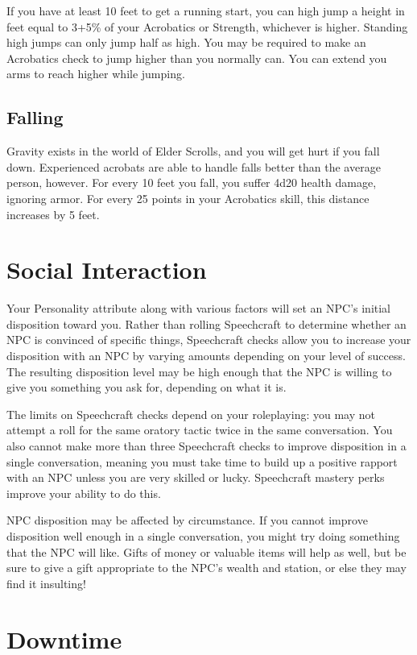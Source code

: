 \documentclass[12pt]{book}
\begin{document}
If you have at least 10 feet to get a running start, you can high jump a height in feet equal to 3+5\% of your Acrobatics or Strength, whichever is higher. Standing high jumps can only jump half as high. You may be required to make an Acrobatics check to jump higher than you normally can. You can extend you arms to reach higher while jumping.

\subsection{Falling}
Gravity exists in the world of Elder Scrolls, and you will get hurt if you fall down. Experienced acrobats are able to handle falls better than the average person, however. For every 10 feet you fall, you suffer 4d20 health damage, ignoring armor. For every 25 points in your Acrobatics skill, this distance increases by 5 feet.

\section{Social Interaction}
Your Personality attribute along with various factors will set an NPC's initial disposition toward you. Rather than rolling Speechcraft to determine whether an NPC is convinced of specific things, Speechcraft checks allow you to increase your disposition with an NPC by varying amounts depending on your level of success. The resulting disposition level may be high enough that the NPC is willing to give you something you ask for, depending on what it is.

The limits on Speechcraft checks depend on your roleplaying: you may not attempt a roll for the same oratory tactic twice in the same conversation. You also cannot make more than three Speechcraft checks to improve disposition in a single conversation, meaning you must take time to build up a positive rapport with an NPC unless you are very skilled or lucky. Speechcraft mastery perks improve your ability to do this.

NPC disposition may be affected by circumstance. If you cannot improve disposition well enough in a single conversation, you might try doing something that the NPC will like. Gifts of money or valuable items will help as well, but be sure to give a gift appropriate to the NPC's wealth and station, or else they may find it insulting!

\section{Downtime}
\end{document}
